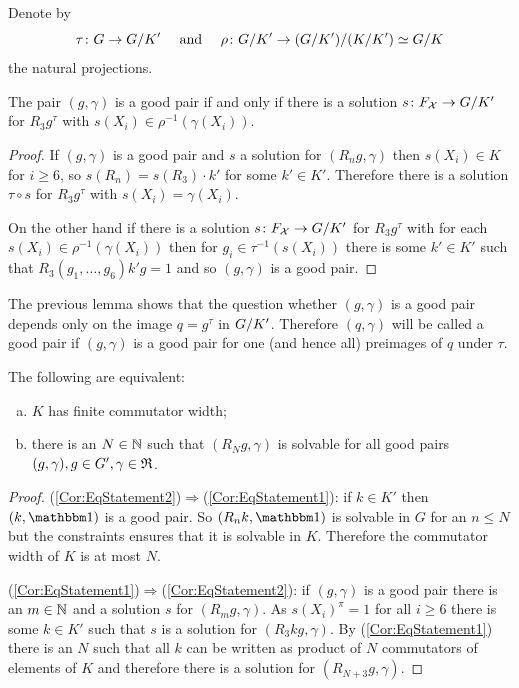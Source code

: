 \documentclass[a4paper,11pt]{amsart}
\begin{document}
\begin{lem}
 Denote by 
 \[\tau\colon G\to{G/K'}\quad\text{ and }\quad\rho\colon {G/K'} \to {({G/K'})/({K/K'})}\simeq {G/K}\]
 the natural projections.
 
 The pair $(g,\gamma)$ is a good pair if and only if there is a solution $s\colon F_{\mathcal{X}} \to {G/K'}$ for $R_3g^\tau$ with $s(X_i) \in \rho^{-1}(\gamma(X_i))$. 
\end{lem}
\begin{proof}
 If $(g,\gamma)$ is a good pair and $s$ a solution for $(R_ng,\gamma)$ 
 then $s(X_i)\in K$ for $i\geq6$, so $s(R_n) = s(R_3) \cdot k'$ for some $k'\in K'$. 
 Therefore there is a solution $\tau\circ s$ for $R_3g^\tau$ with $s(X_i) = \gamma(X_i)$.
 
 On the other hand if there is a solution $s\colon F_{\mathcal{X}} \to {G/K'}$ for $R_3g^\tau$ with for each $s(X_i) \in \rho^{-1}(\gamma(X_i))$ then
 for $g_i \in \tau^{-1}(s(X_i))$ there is some $k'\in K'$ such that $R_3(g_1,\dotsc,g_6)k'g=1$ and so $(g,\gamma)$ is a good pair.
\end{proof}
The previous lemma shows that the question whether $(g,\gamma)$ is a good pair depends only on the image $q=g^\tau$ in ${G/K'}$. Therefore
$(q,\gamma)$ will be called a good pair if $(g,\gamma)$ is a good pair for one (and hence all) preimages of $q$ under $\tau$.
\begin{cor}\label{cor:finiteCommutatorWidthKimpliesBoundedConstraintedCommutators}
The following are equivalent:
\begin{enumerate}[(a)]
 \item $K$ has finite commutator width; \label{Cor:EqStatement1}
 \item there is an $N\in\mathbb{N}$ such that $(R_Ng,\gamma)$ is solvable 
 for all good pairs $(g,\gamma),g \in G',\gamma\in\mathfrak{R}$.
 \label{Cor:EqStatement2}
\end{enumerate} 
\end{cor}
\begin{proof}
 (\ref{Cor:EqStatement2})$\Rightarrow$(\ref{Cor:EqStatement1}): if $k\in K'$ then $(k,\id)$ is a good pair.
 So $(R_nk,\id)$ is solvable in $G$ for an $n\leq N$ but the constraints ensures that it is solvable in $K$.
 Therefore the commutator width of $K$ is at most $N$.
 
 (\ref{Cor:EqStatement1})$\Rightarrow$(\ref{Cor:EqStatement2}): if $(g,\gamma)$ is a good pair 
 there is an $m\in \mathbb{N}$ and a solution $s$ for $(R_mg,\gamma)$. As $s(X_i)^\pi =1$ for all $i\geq 6$ there is some $k\in K'$ such that $s$ is 
 a solution for $(R_3kg,\gamma)$. By (\ref{Cor:EqStatement1}) there is 
 an $N$ such that all $k$ can be written as product of $N$ commutators of elements of $K$ and
 therefore there is a solution for $(R_{N+3}g,\gamma)$.
\end{proof}
\end{document}
